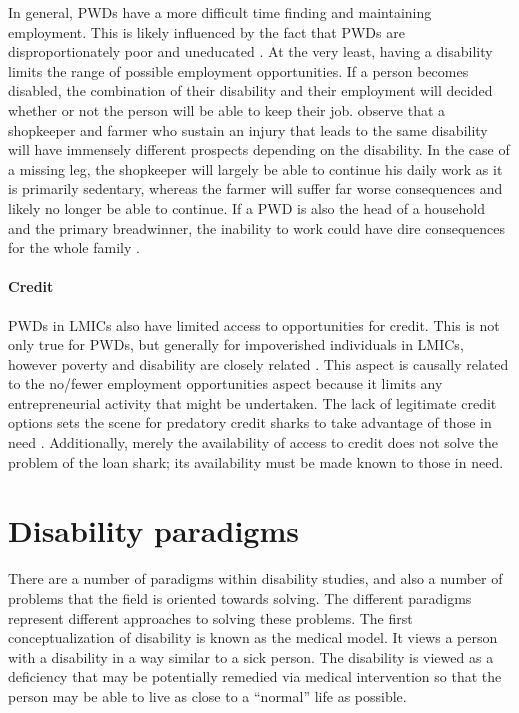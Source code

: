 \documentclass[a4paper]{article}
\begin{document}
In general, PWDs have a more difficult time finding and maintaining
employment.  This is likely influenced by the fact that PWDs are
disproportionately poor and uneducated \cite{lamichhane2014nexus}. At the very
least, having a disability limits the range of possible employment
opportunities. If a person becomes disabled, the combination of their
disability and their employment will decided whether or not the person will be
able to keep their job.  \cite{chowdhury2006economics} observe that a
shopkeeper and farmer who sustain an injury that leads to the same disability
will have immensely different prospects depending on the disability. In the
case of a missing leg, the shopkeeper will largely be able to continue his
daily work as it is primarily sedentary, whereas the farmer will suffer far
worse consequences and likely no longer be able to continue. If a PWD is also
the head of a household and the primary breadwinner, the inability to work
could have dire consequences for the whole family \citep{world2011world}.


\paragraph{Credit}

PWDs in LMICs also have limited access to opportunities for credit. This is
not only true for PWDs, but generally for impoverished individuals in LMICs,
however poverty and disability are closely related
\citep{palmer2011disability}. This aspect is causally related to the no/fewer
employment opportunities aspect because it limits any entrepreneurial activity
that might be undertaken. The lack of legitimate credit options sets the scene
for predatory credit sharks to take advantage of those in need
\citep{beisland2017exploring}. Additionally, merely the availability of access
to credit does not solve the problem of the loan shark; its availability must
be made known to those in need.


\newpage
\section{Disability paradigms}
\label{models}

There are a number of paradigms within disability studies, and also a number
of problems that the field is oriented towards solving. The different
paradigms represent different approaches to solving these problems. The first
conceptualization of disability is known as the medical model. It views a
person with a disability in a way similar to a sick person. The disability is
viewed as a deficiency that may be potentially remedied via medical
intervention so that the person may be able to live as close to a ``normal''
life as possible. 
\end{document}
